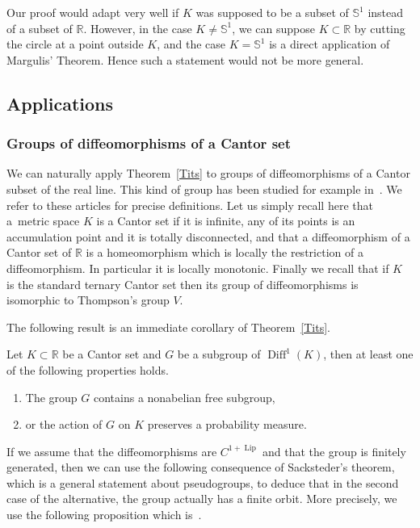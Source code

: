 \documentclass[AHL,Unicode,longabstracts,published]{cedram}
\DeclareMathOperator{\Diff}{Diff}
\DeclareMathOperator{\Lip}{Lip}
\newcommand{\bbS}{\mathbb{S}}
\newcommand{\R}{\mathbb{R}}
\newcounter{setofcase}
\newcounter{case}[setofcase]
\newcommand{\R}{\mathbb{R}}
\begin{document}
\begin{rema}
Our proof would adapt very well if $K$ was supposed to be a subset of $\bbS^1$ instead of a subset of $\R$. However, in the case $K\not=\bbS^1$, we can suppose $K \subset \R$ by cutting the circle at a point outside $K$, and the case $K=\bbS^1$ is a direct application of Margulis' Theorem. Hence such a statement would not be more general.
\end{rema}


\subsection{Applications}

\subsubsection*{Groups of diffeomorphisms of a Cantor set}

We can naturally apply Theorem~\ref{Tits} to groups of diffeomorphisms of a Cantor subset of the real line. This kind of group has been studied for example in~\cite{FN,MM}. We refer to these articles for precise definitions. Let us simply recall here that a~metric space $K$ is a Cantor set if it is infinite, any of its points is an accumulation point and it is totally disconnected, and that a diffeomorphism of a Cantor set of $\R$ is a homeomorphism which is locally the restriction of a diffeomorphism. In particular it is locally monotonic. Finally we recall that if $K$ is the standard ternary Cantor set then its group of diffeomorphisms is isomorphic to Thompson's group $V$.

The following result is an immediate corollary of Theorem~\ref{Tits}.

\begin{coro}
Let $K\subset \R$ be a Cantor set and $G$ be a subgroup of $\Diff^1(K)$, then at least one of the following properties holds.
\begin{enumerate}
\item\label{coro1.5.1} The group $G$ contains a nonabelian free subgroup,
\item\label{coro1.5.2} or the action of $G$ on $K$ preserves a probability measure.
\end{enumerate}
\end{coro}

If we assume that the diffeomorphisms are $C^{1+\Lip}$ and that the group is finitely generated, then we can use the following consequence of Sacksteder's theorem, which is a general statement about pseudogroups, to deduce that in the second case of the alternative, the group actually has a finite orbit. More precisely, we use the following proposition which is~\cite[Proposition~3.2]{MM}.
\end{document}
